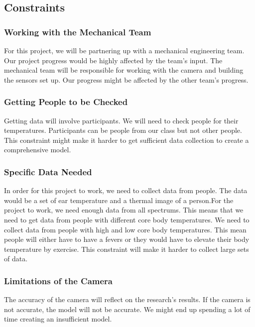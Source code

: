 \subsection*{Constraints}
	\subsubsection*{Working with the Mechanical Team}
	For this project, we will be partnering up with a mechanical engineering team. Our project progress would be highly affected by the team’s input. The mechanical team will be responsible for working with the camera and building the sensors set up. Our progress might be affected by the other team’s progress.
	\subsubsection*{Getting People to be Checked}
	Getting data will involve participants. We will need to check people for their temperatures. Participants can be people from our class but not other people. This constraint might make it harder to get sufficient data collection to create a comprehensive model.
	\subsubsection*{Specific Data Needed}
	In order for this project to work, we need to collect data from people. The data would be a set of ear temperature and a thermal image of a person.For the project to work, we need enough data from all spectrums. This means that we need to get data from people with different core body temperatures. We need to collect data from people with high and low core body temperatures. This mean people will either have to have a fevers or they would have to elevate their body temperature by exercise. This constraint will make it harder to collect large sets of data.
	\subsubsection*{Limitations of the Camera}
	The accuracy of the camera will reflect on the research’s results. If the camera is not accurate, the model will not be accurate. We might end up spending a lot of time creating an insufficient model.

